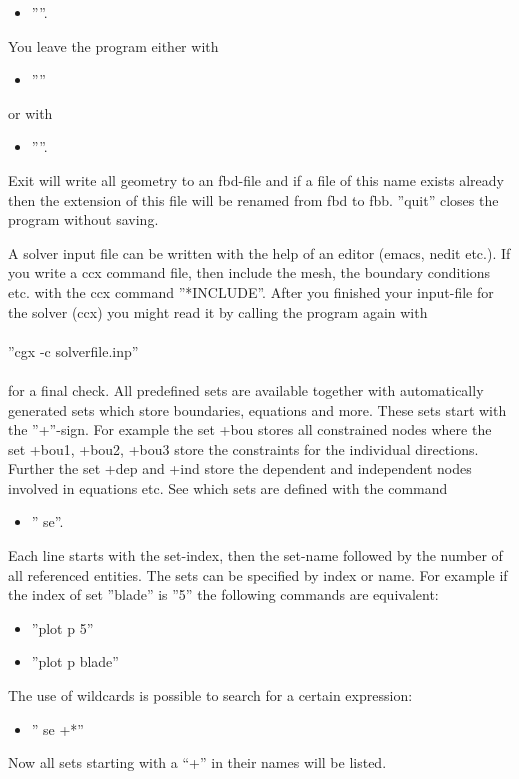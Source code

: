 \documentclass{article}
\begin{document}
\begin{itemize}
\item ''''.
\end{itemize}
You leave the program either with 
\begin{itemize}
\item ''''
\end{itemize}
or with
\begin{itemize}
\item ''''.
\end{itemize}
Exit will write all geometry to an fbd-file and if a file of this name exists already then the extension of this file will be renamed from fbd to fbb. ''quit''  closes the program without saving. 

A solver input file can be written with the help of an editor (emacs, nedit etc.). If you write a ccx command file, then include the mesh, the boundary conditions etc. with the ccx command ''*INCLUDE''. After you finished your input-file for the solver (ccx) you might read it by calling the program again with\\\\  ''cgx -c solverfile.inp''\\\\for a final check. All predefined sets are available together with automatically generated sets which store boundaries, equations and more. These sets start with the ''+''-sign. For example the set +bou stores all constrained nodes where the set +bou1, +bou2, +bou3 store the constraints for the individual directions. Further the set +dep and +ind store the dependent and independent nodes involved in equations etc. See which sets are defined with the command
\begin{itemize}
\item '' se''.
\end{itemize}
Each line starts with the set-index, then the set-name followed by the number of all referenced entities. The sets can be specified by index or name. For example if the index of set ''blade'' is ''5'' the following commands are equivalent:
\begin{itemize}
\item ''plot p 5''
\item ''plot p blade''
\end{itemize}
The use of wildcards is possible to search for a certain expression:
\begin{itemize}
\item '' se +*''
\end{itemize}
Now all sets starting with a ``+'' in their names will be listed.
\end{document}
